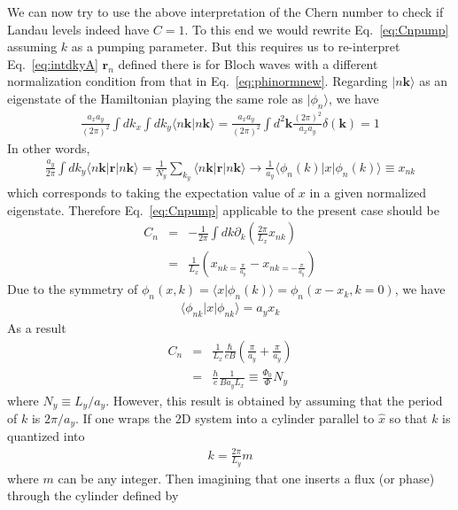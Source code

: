 We can now try to use the above interpretation of the Chern number to check if Landau levels indeed have $C=1$. To this end we would rewrite Eq.~\eqref{eq:Cnpump} assuming $k$ as a pumping parameter. But this requires us to re-interpret Eq.~\eqref{eq:intdkyA} $\mathbf r_n$ defined there is for Bloch waves with a different normalization condition from that in Eq.~\eqref{eq:phinormnew}. Regarding $|n\mathbf k\rangle$ as an eigenstate of the Hamiltonian playing the same role as $|\phi_n\rangle$, we have
\begin{eqnarray}
	\frac{a_x a_y}{(2\pi)^2}\int dk_x \int dk_y \langle n\mathbf k | n\mathbf k\rangle = 	\frac{a_x a_y}{(2\pi)^2} \int d^2\mathbf k \frac{(2\pi)^2}{a_x a_y} \delta(\mathbf k) = 1
\end{eqnarray}
In other words,
\begin{eqnarray}\label{eq:xnkdef}
	\frac{a_y}{2\pi} \int dk_y \langle n\mathbf k | \mathbf r |n\mathbf k\rangle = \frac{1}{N_y}\sum_{k_y} \langle n\mathbf k|\mathbf r|n\mathbf k\rangle \rightarrow \frac{1}{a_y}\langle \phi_n(k) | x | \phi_n(k)\rangle \equiv x_{nk}
\end{eqnarray}
which corresponds to taking the expectation value of $x$ in a given normalized eigenstate. Therefore Eq.~\eqref{eq:Cnpump} applicable to the present case should be
\begin{eqnarray}
	C_n &=& -\frac{1}{2\pi}\int dk \partial_k \left(\frac{2\pi}{L_x} x_{nk}\right)\\\nonumber
	&=&\frac{1}{L_x} \left(x_{n k = \frac{\pi}{a_y}} - x_{nk = -\frac{\pi}{a_y}}\right)
\end{eqnarray}
Due to the symmetry of $\phi_n(x,k) = \langle x| \phi_{n}(k)\rangle = \phi_n (x-x_k, k=0) $, we have
\begin{eqnarray}
	\langle \phi_{nk} | x | \phi_{nk} \rangle = a_y x_k
\end{eqnarray}
As a result
\begin{eqnarray}
C_n &=& \frac{1}{L_x}\frac{\hbar}{eB}\left(\frac{\pi}{a_y} + \frac{\pi}{a_y} \right)\\\nonumber
&=& \frac{h}{e}\frac{1}{B a_y L_x} \equiv \frac{\Phi_0}{\Phi} N_y
\end{eqnarray}
where $N_y \equiv L_y/a_y$. However, this result is obtained by assuming that the period of $k$ is $2\pi/a_y$. If one wraps the 2D system into a cylinder parallel to $\hat{x}$ so that $k$ is quantized into
\begin{eqnarray}
	k = \frac{2\pi}{L_y}m
\end{eqnarray}
where $m$ can be any integer. Then imagining that one inserts a flux (or phase) through the cylinder defined by
